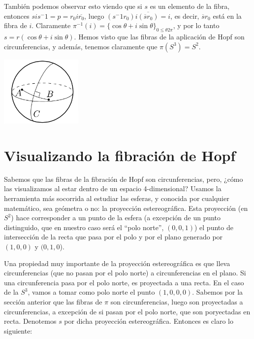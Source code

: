 \documentclass[11pt]{diazessay} %
\begin{document}
También podemos observar esto viendo que si $s$ es un elemento de la fibra, entonces $sis^-1=p=r_0i\overline{r_0}$, luego $(s^-1r_0)i\overline{(\overline{s}r_0)}=i$, es decir, $\overline{s}r_0$ está en la fibra de $i$. Claramente $\pi^{-1}(i)=\{\cos\theta+i\sin\theta\}_{0\leq\theta 2\pi}$, y por lo tanto $s=r(\cos\theta+i\sin\theta)$.
Hemos visto que las fibras de la aplicación de Hopf son circunferencias, y además, tenemos claramente que $\pi(S^3)=S^2$.

\begin{center}
    \includegraphics[width=4cm]{Figures/bisectriz.png}
\end{center}

\section*{Visualizando la fibración de Hopf}

Sabemos que las fibras de la fibración de Hopf son circunferencias, pero, ¿cómo las visualizamos al estar dentro de un espacio 4-dimensional? Usamos la herramienta más socorrida al estudiar las esferas, y conocida por cualquier matemático, sea geómetra o no: la proyección estereográfica. Esta proyección (en $S^2$) hace corresponder a un punto de la esfera (a excepción de un punto distinguido, que en nuestro caso será el ``polo norte'', $(0,0,1)$) el punto de intersección de la recta que pasa por el polo y por el plano generado por $(1,0,0)$ y $(0,1,0$).

Una propiedad muy importante de la proyección estereográfica es que lleva circunferencias (que no pasan por el polo norte) a circunferencias en el plano. Si una circunferencia pasa por el polo norte, es proyectada a una recta. En el caso de la $S^3$, vamos a tomar como polo norte el punto $(1,0,0,0)$. Sabemos por la sección anterior que las fibras de $\pi$ son circunferencias, luego son proyectadas a circunferencias, a excepción de si pasan por el polo norte, que son poryectadas en recta. Denotemos $s$ por dicha proyección estereográfica. Entonces es claro lo siguiente:
\end{document}
